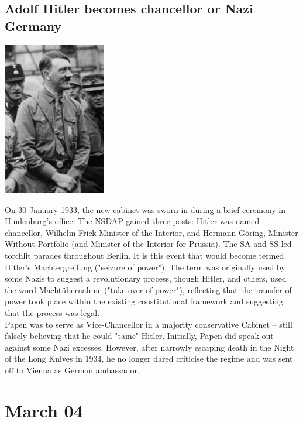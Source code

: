 \documentclass[11pt]{report}
\begin{document}
\subsection{Adolf Hitler becomes chancellor or Nazi Germany}
\vspace{2mm}\begin{center}\includegraphics[width=4.5cm]{./img/hitlerChancellor.jpg}\end{center}
On 30 January 1933, the new cabinet was sworn in during a brief ceremony in Hindenburg's office. The NSDAP gained three posts: Hitler was named chancellor, Wilhelm Frick Minister of the Interior, and Hermann Göring, Minister Without Portfolio (and Minister of the Interior for Prussia). The SA and SS led torchlit parades throughout Berlin. It is this event that would become termed Hitler's Machtergreifung ("seizure of power"). The term was originally used by some Nazis to suggest a revolutionary process, though Hitler, and others, used the word Machtübernahme ("take-over of power"), reflecting that the transfer of power took place within the existing constitutional framework and suggesting that the process was legal.\\ \indent Papen was to serve as Vice-Chancellor in a majority conservative Cabinet – still falsely believing that he could "tame" Hitler. Initially, Papen did speak out against some Nazi excesses. However, after narrowly escaping death in the Night of the Long Knives in 1934, he no longer dared criticise the regime and was sent off to Vienna as German ambassador.
\section{March 04}
\end{document}

